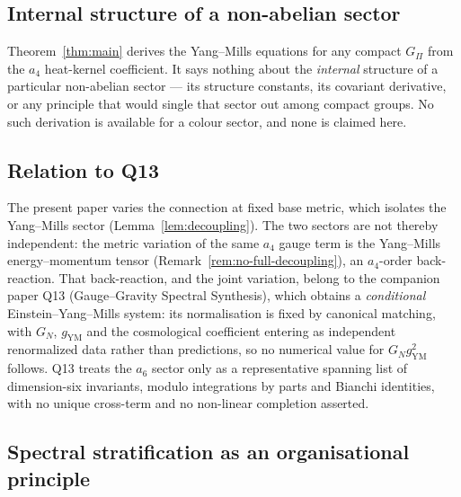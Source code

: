 \documentclass[12pt,a4paper]{article}
\theoremstyle{remark}
\theoremstyle{plain}
\theoremstyle{definition}
\begin{document}
    \subsection{Internal structure of a non-abelian sector}
      \label{subsec:su3-uniqueness}

      Theorem~\ref{thm:main} derives the Yang--Mills equations for any compact $G_\Pi$ from
      the $a_4$ heat-kernel coefficient.
      It says nothing about the \emph{internal} structure of a particular non-abelian
      sector --- its structure constants, its covariant derivative, or any principle that
      would single that sector out among compact groups.
      No such derivation is available for a colour sector, and none is claimed here.

    \subsection{Relation to Q13}
      \label{subsec:q13}

      The present paper varies the connection at fixed base metric, which isolates the
      Yang--Mills sector (Lemma~\ref{lem:decoupling}). The two sectors are not thereby
      independent: the metric variation of the same $a_4$ gauge term is the Yang--Mills
      energy--momentum tensor (Remark~\ref{rem:no-full-decoupling}), an $a_4$-order back-reaction.
      That back-reaction, and the joint variation, belong to the companion paper Q13
      (Gauge--Gravity Spectral Synthesis), which obtains a \emph{conditional}
      Einstein--Yang--Mills system: its normalisation is fixed by canonical matching, with
      $G_N$, $g_{\mathrm{YM}}$ and the cosmological coefficient entering as independent
      renormalized data rather than predictions, so no numerical value for
      $G_N g_{\mathrm{YM}}^2$ follows.
      Q13 treats the $a_6$ sector only as a representative spanning list of dimension-six
      invariants, modulo integrations by parts and Bianchi identities, with no unique cross-term
      and no non-linear completion asserted.

    \subsection{Spectral stratification as an organisational
    principle}
      \label{subsec:spectral-stratification}
\end{document}
